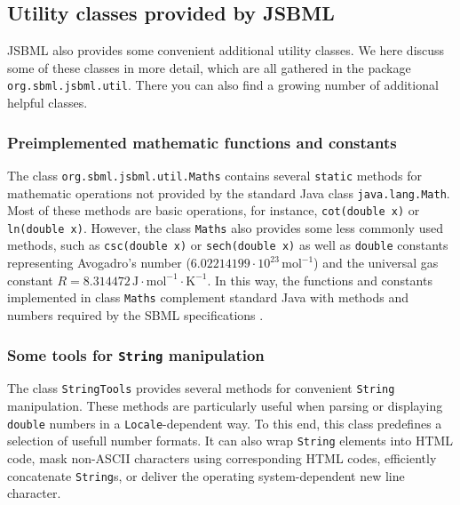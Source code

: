 \subsection{Utility classes provided by JSBML}

JSBML also provides some convenient additional utility classes. We here discuss
some of these classes in more detail, which are all gathered in
the package \texttt{org.sbml.jsbml.util}. There you can also find a growing
number of additional helpful classes.


\subsubsection{Preimplemented mathematic functions and constants}

The class \texttt{org.sbml.jsbml.util.Maths}
%
contains several \texttt{static} methods for mathematic operations not provided
by the standard Java class \texttt{java.lang.Math}. Most of these methods are
basic operations, for instance, \texttt{cot(double x)} or \texttt{ln(double x)}.
However, the class \texttt{Maths} also provides some less commonly used methods,
such as \texttt{csc(double x)} or \texttt{sech(double x)} as well as
\texttt{double} constants representing Avogadro's number ($6.02214199 \cdot
10^{23}\,\mathrm{mol}^{-1}$) and the universal gas constant
$R = 8.314472\,\mathrm{J}\cdot\mathrm{mol}^{-1}\cdot\mathrm{K}^{-1}$. In this
way, the functions and constants implemented in class \texttt{Maths} complement
standard Java with methods and numbers required by the SBML specifications
\citep{Hucka2003, Hucka2008, Hucka2010a}.

\subsubsection{Some tools for \texttt{String} manipulation}

The class \texttt{StringTools}
%
provides several methods for convenient \texttt{String} manipulation. These
methods are particularly useful when parsing or displaying \texttt{double}
numbers in a \texttt{Locale}\hyp{}dependent way. To this end, this class
predefines a selection of usefull number formats. It can also wrap
\texttt{String} elements into HTML code, mask non-ASCII characters using
corresponding HTML codes, efficiently concatenate \texttt{String}s, or deliver
the operating system\hyp{}dependent new line character.


